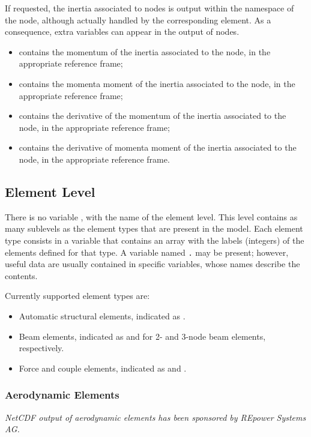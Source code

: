 If requested, the inertia associated to  nodes is output
within the namespace of the node, although actually handled
by the corresponding  element.
As a consequence, extra variables can appear in the output
of  nodes.
\begin{itemize}
\item {} contains the momentum of the inertia
associated to the node, in the appropriate reference frame;

\item {} contains the momenta moment of the inertia
associated to the node, in the appropriate reference frame;

\item {} contains the derivative of the momentum
of the inertia associated to the node, in the appropriate reference frame;

\item {} contains the derivative of momenta moment
of the inertia associated to the node, in the appropriate reference frame.
\end{itemize}


\subsection{Element Level}
There is no variable , with the name of the element level.
This level contains as many sublevels as the element types
that are present in the model.
Each element type consists in a variable that contains an array
with the labels (integers) of the elements defined for that type.
A variable named \texttt{.} may be present; however,
useful data are usually contained in specific variables,
whose names describe the contents.

Currently supported element types are:
\begin{itemize}
\item Automatic structural elements, indicated as .
\item Beam elements, indicated as  and 
for 2- and 3-node beam elements, respectively.
\item Force and couple elements, indicated as  and .
\end{itemize}


\subsubsection{Aerodynamic Elements}
\label{sec:NetCDF:Elem:Aerodynamic}
\emph{NetCDF output of aerodynamic elements has been sponsored
by REpower Systems AG.}


